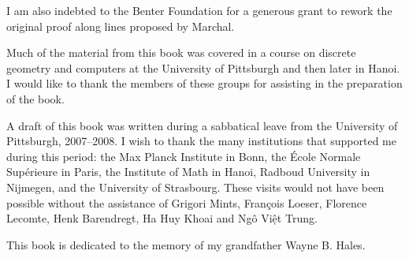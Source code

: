 I am also indebted to the Benter Foundation for a generous grant to
rework the original proof along lines proposed by Marchal.

Much of the material from this book was covered in a course on
discrete geometry and computers at the University of Pittsburgh and
then later in Hanoi.  I would like to thank the members of these
groups for assisting in the preparation of the book.

A draft of this book was written during a sabbatical leave from the
University of Pittsburgh, 2007--2008.  I wish to thank the many
institutions that supported me during this period: the Max Planck
Institute in Bonn, the \'Ecole Normale Sup\'erieure in Paris, the
Institute of Math in Hanoi, Radboud University in Nijmegen, and the
University of Strasbourg.  These visits would not have been possible
without the assistance of Grigori Mints, Fran\c{c}ois Loeser, Florence
Lecomte, Henk Barendregt, Ha Huy Khoai and Ng\^o Vi\d{\^e}t Trung.

\bigskip

This book is dedicated to the memory of my grandfather Wayne B. Hales.


